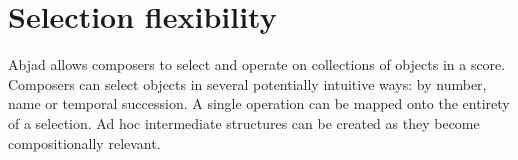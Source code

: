 \documentclass{article}
\begin{document}

\section{Selection flexibility} \label{sec:selection-flexibility}

Abjad allows composers to select and operate on collections of
objects in a score. Composers can select objects in several
potentially intuitive ways: by number, name or temporal succession. A single operation can be mapped onto the entirety of a selection. Ad hoc intermediate structures can be created as they become
compositionally relevant.



\end{document}
